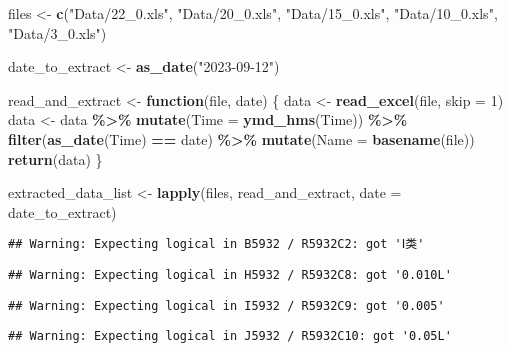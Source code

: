 \documentclass[
]{article}
\newenvironment{Shaded}{\begin{snugshade}}{\end{snugshade}}
\newcommand{\AttributeTok}[1]{\textcolor[rgb]{0.13,0.29,0.53}{#1}}
\newcommand{\ControlFlowTok}[1]{\textcolor[rgb]{0.13,0.29,0.53}{\textbf{#1}}}
\newcommand{\DecValTok}[1]{\textcolor[rgb]{0.00,0.00,0.81}{#1}}
\newcommand{\FunctionTok}[1]{\textcolor[rgb]{0.13,0.29,0.53}{\textbf{#1}}}
\newcommand{\NormalTok}[1]{#1}
\newcommand{\OtherTok}[1]{\textcolor[rgb]{0.56,0.35,0.01}{#1}}
\newcommand{\SpecialCharTok}[1]{\textcolor[rgb]{0.81,0.36,0.00}{\textbf{#1}}}
\newcommand{\StringTok}[1]{\textcolor[rgb]{0.31,0.60,0.02}{#1}}
\begin{document}
\begin{Shaded}
\begin{Highlighting}[]
\NormalTok{files }\OtherTok{\textless{}{-}} \FunctionTok{c}\NormalTok{(}\StringTok{"Data/22\_0.xls"}\NormalTok{, }\StringTok{"Data/20\_0.xls"}\NormalTok{, }\StringTok{"Data/15\_0.xls"}\NormalTok{, }\StringTok{"Data/10\_0.xls"}\NormalTok{, }\StringTok{"Data/3\_0.xls"}\NormalTok{)}


\NormalTok{date\_to\_extract }\OtherTok{\textless{}{-}} \FunctionTok{as\_date}\NormalTok{(}\StringTok{"2023{-}09{-}12"}\NormalTok{)}

\NormalTok{read\_and\_extract }\OtherTok{\textless{}{-}} \ControlFlowTok{function}\NormalTok{(file, date) \{}
\NormalTok{  data }\OtherTok{\textless{}{-}} \FunctionTok{read\_excel}\NormalTok{(file, }\AttributeTok{skip =} \DecValTok{1}\NormalTok{)}
\NormalTok{  data }\OtherTok{\textless{}{-}}\NormalTok{ data }\SpecialCharTok{\%\textgreater{}\%}
    \FunctionTok{mutate}\NormalTok{(}\AttributeTok{Time =} \FunctionTok{ymd\_hms}\NormalTok{(Time)) }\SpecialCharTok{\%\textgreater{}\%}
    \FunctionTok{filter}\NormalTok{(}\FunctionTok{as\_date}\NormalTok{(Time) }\SpecialCharTok{==}\NormalTok{ date) }\SpecialCharTok{\%\textgreater{}\%}
    \FunctionTok{mutate}\NormalTok{(}\AttributeTok{Name =} \FunctionTok{basename}\NormalTok{(file))  }
  \FunctionTok{return}\NormalTok{(data)}
\NormalTok{\}}


\NormalTok{extracted\_data\_list }\OtherTok{\textless{}{-}} \FunctionTok{lapply}\NormalTok{(files, read\_and\_extract, }\AttributeTok{date =}\NormalTok{ date\_to\_extract)}
\end{Highlighting}
\end{Shaded}

\begin{verbatim}
## Warning: Expecting logical in B5932 / R5932C2: got 'Ⅰ类'
\end{verbatim}

\begin{verbatim}
## Warning: Expecting logical in H5932 / R5932C8: got '0.010L'
\end{verbatim}

\begin{verbatim}
## Warning: Expecting logical in I5932 / R5932C9: got '0.005'
\end{verbatim}

\begin{verbatim}
## Warning: Expecting logical in J5932 / R5932C10: got '0.05L'
\end{verbatim}
\end{document}
